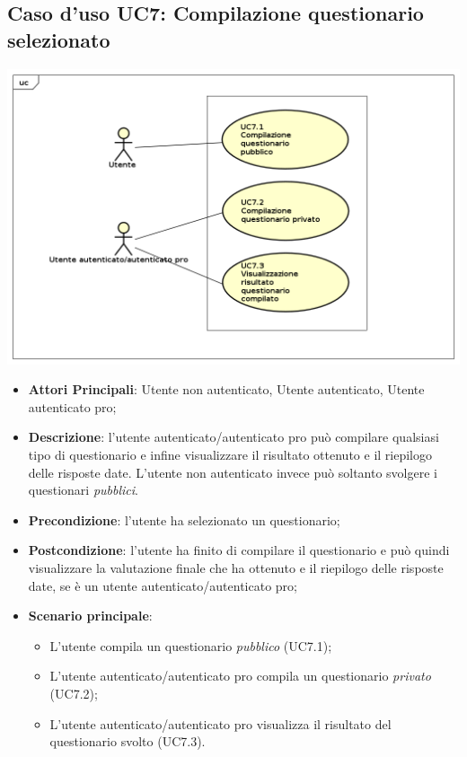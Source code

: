 \subsection{Caso d'uso UC7: Compilazione questionario selezionato}
\begin{center}
\includegraphics[scale=0.5]{UML/UC7.png}
\end{center}
\begin{itemize}
\item\textbf{Attori Principali}: Utente non autenticato, Utente autenticato, Utente autenticato pro;
\item\textbf{Descrizione}: l'utente autenticato/autenticato pro può compilare qualsiasi tipo di questionario e infine visualizzare il risultato ottenuto e il riepilogo delle risposte date. L'utente non autenticato invece può soltanto svolgere i questionari \textit{pubblici}.
\item\textbf{Precondizione}: l'utente ha selezionato un questionario;
\item\textbf{Postcondizione}: l'utente ha finito di compilare il questionario e può quindi visualizzare la valutazione finale che ha ottenuto e il riepilogo delle risposte date, se è un utente autenticato/autenticato pro;
\item\textbf{Scenario principale}:
\begin{itemize}
\item L'utente compila un questionario \textit{pubblico} (UC7.1);
\item L'utente autenticato/autenticato pro compila un questionario \textit{privato} (UC7.2);
\item L'utente autenticato/autenticato pro visualizza il risultato del questionario svolto (UC7.3).
\end{itemize}
\end{itemize}

